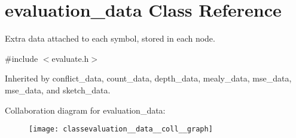 \hypertarget{classevaluation__data}{}\section{evaluation\+\_\+data Class Reference}
\label{classevaluation__data}


Extra data attached to each symbol, stored in each node.  




{\ttfamily \#include $<$evaluate.\+h$>$}



Inherited by conflict\+\_\+data, count\+\_\+data, depth\+\_\+data, mealy\+\_\+data, mse\+\_\+data, mse\+\_\+data, and sketch\+\_\+data.



Collaboration diagram for evaluation\+\_\+data\+:\nopagebreak
\begin{figure}[H]
\begin{center}
\leavevmode
\texttt{[image: classevaluation\_\_data\_\_coll\_\_graph]}
\end{center}
\end{figure}
